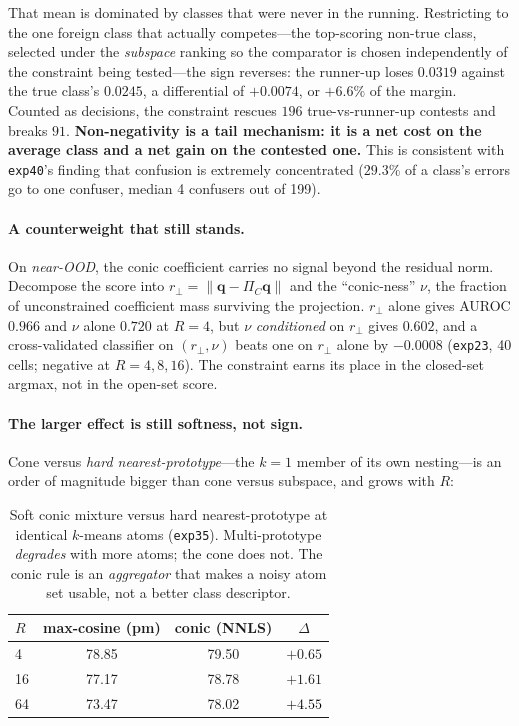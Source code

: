 \documentclass[10pt,twocolumn]{article}
\newcommand{\bq}{\mathbf{q}}
\newcommand{\good}[1]{\textcolor{black}{\textbf{#1}}}
\begin{document}
That mean is dominated by classes that were never in the running. Restricting to
the one foreign class that actually competes---the top-scoring non-true class,
selected under the \emph{subspace} ranking so the comparator is chosen
independently of the constraint being tested---the sign reverses: the runner-up
loses $0.0319$ against the true class's $0.0245$, a differential of
$\mathbf{+0.0074}$, or $+6.6\%$ of the margin. Counted as decisions, the
constraint rescues $196$ true-vs-runner-up contests and breaks $91$.
\textbf{Non-negativity is a tail mechanism: it is a net cost on the average class
and a net gain on the contested one.} This is consistent with \texttt{exp40}'s
finding that confusion is extremely concentrated ($29.3\%$ of a class's errors
go to one confuser, median 4 confusers out of 199).

\paragraph{A counterweight that still stands.} On \emph{near-OOD}, the conic
coefficient carries no signal beyond the residual norm. Decompose the score into
$r_\perp=\lVert\bq-\Pi_C\bq\rVert$ and the ``conic-ness'' $\nu$, the fraction of
unconstrained coefficient mass surviving the projection. $r_\perp$ alone gives
AUROC $0.966$ and $\nu$ alone $0.720$ at $R{=}4$, but $\nu$ \emph{conditioned}
on $r_\perp$ gives $0.602$, and a cross-validated classifier on $(r_\perp,\nu)$
beats one on $r_\perp$ alone by $-0.0008$ (\texttt{exp23}, 40 cells; negative at
$R{=}4,8,16$). The constraint earns its place in the closed-set argmax, not in
the open-set score.

\paragraph{The larger effect is still softness, not sign.} Cone versus
\emph{hard nearest-prototype}---the $k{=}1$ member of its own nesting---is an
order of magnitude bigger than cone versus subspace, and grows with $R$:

\begin{table}[t]\centering\small
\begin{tabular}{lccc}
\toprule
$R$ & max-cosine (pm) & conic (NNLS) & $\Delta$ \\
\midrule
4  & 78.85 & 79.50 & $+0.65$ \\
16 & 77.17 & 78.78 & $+1.61$ \\
64 & 73.47 & 78.02 & \good{$+4.55$} \\
\bottomrule
\end{tabular}
\caption{Soft conic mixture versus hard nearest-prototype at identical
$k$-means atoms (\texttt{exp35}). Multi-prototype \emph{degrades} with more
atoms; the cone does not. The conic rule is an \emph{aggregator} that makes a
noisy atom set usable, not a better class descriptor.}
\label{tab:rule}
\end{table}
\end{document}
